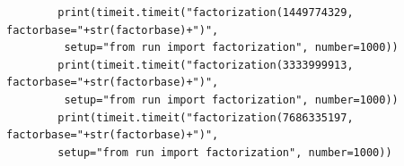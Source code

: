 \documentclass[10pt,a4paper]{report}
\begin{document}
\begin{verbatim}
        print(timeit.timeit("factorization(1449774329, factorbase="+str(factorbase)+")",
         setup="from run import factorization", number=1000))
        print(timeit.timeit("factorization(3333999913, factorbase="+str(factorbase)+")",
         setup="from run import factorization", number=1000))
        print(timeit.timeit("factorization(7686335197, factorbase="+str(factorbase)+")", 
        setup="from run import factorization", number=1000))

\end{verbatim}
\end{document}
